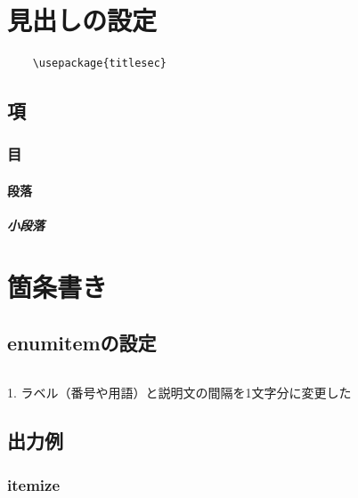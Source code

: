 \documentclass[
    article,
    head_space=25truemm,
    foot_space=10truemm,
    gutter=15truemm]{jlreq}
\begin{document}
\section{見出しの設定}

\begin{verbatim}
    \usepackage{titlesec}
\end{verbatim}


\subsection{項}


\subsubsection{目}


\paragraph{段落}


\subparagraph{小段落}






\section{箇条書き}

\subsection{enumitemの設定}

\inputminted{latex}{./preamble/enumitem.tex}

\begin{markdown}
1. ラベル（番号や用語）と説明文の間隔を1文字分に変更した
\end{markdown}

\subsection{出力例}

\subsubsection{itemize}
\end{document}
